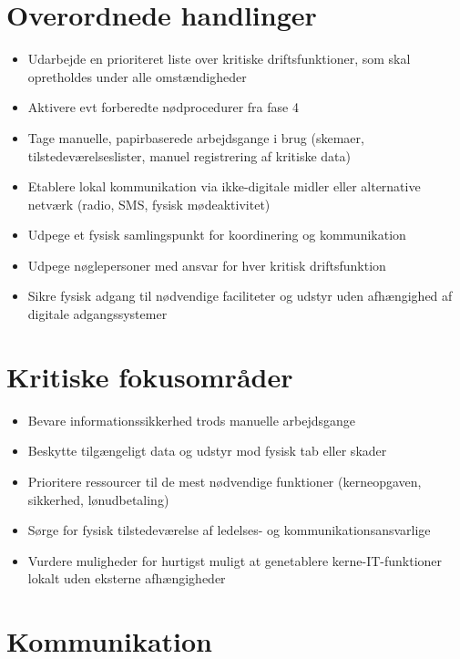 \documentclass[a4paper,11pt,oneside]{book}
\def\tightlist{}
\begin{document}
\section{Overordnede handlinger}\label{overordnede-handlinger}

\begin{itemize}
\tightlist
\item
  Udarbejde en prioriteret liste over kritiske driftsfunktioner, som
  skal opretholdes under alle omstændigheder
\item
  Aktivere evt forberedte nødprocedurer fra fase 4
\item
  Tage manuelle, papirbaserede arbejdsgange i brug (skemaer,
  tilstedeværelseslister, manuel registrering af kritiske data)
\item
  Etablere lokal kommunikation via ikke-digitale midler eller
  alternative netværk (radio, SMS, fysisk mødeaktivitet)
\item
  Udpege et fysisk samlingspunkt for koordinering og kommunikation
\item
  Udpege nøglepersoner med ansvar for hver kritisk driftsfunktion
\item
  Sikre fysisk adgang til nødvendige faciliteter og udstyr uden
  afhængighed af digitale adgangssystemer
\end{itemize}

\section{Kritiske fokusområder}\label{kritiske-fokusomruxe5der}

\begin{itemize}
\tightlist
\item
  Bevare informationssikkerhed trods manuelle arbejdsgange
\item
  Beskytte tilgængeligt data og udstyr mod fysisk tab eller skader
\item
  Prioritere ressourcer til de mest nødvendige funktioner (kerneopgaven,
  sikkerhed, lønudbetaling)
\item
  Sørge for fysisk tilstedeværelse af ledelses- og
  kommunikationsansvarlige
\item
  Vurdere muligheder for hurtigst muligt at genetablere
  kerne-IT-funktioner lokalt uden eksterne afhængigheder
\end{itemize}

\section{Kommunikation}\label{kommunikation}
\end{document}
